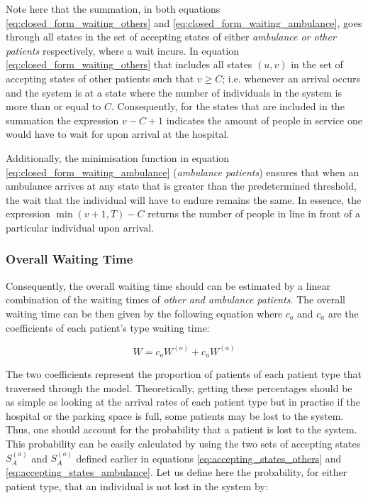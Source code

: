 Note here that the summation, in both equations \ref{eq:closed_form_waiting_others} 
and \ref{eq:closed_form_waiting_ambulance}, goes through all states in the set of accepting 
states of either \textit{ambulance or other patients} respectively, where a wait 
incurs. 
In equation \ref{eq:closed_form_waiting_others} that includes all states \((u,v)\) 
in the set of accepting states of other patients such that \( v \geq C\); i.e. 
whenever an arrival occurs and the system is at a state where the number of individuals 
in the system is more than or equal to $C$. 
Consequently, for the states that are included in the summation  the expression 
\( v-C+1 \) indicates the amount of people in service one would have to wait for 
upon arrival at the hospital.

Additionally, the minimisation function in equation \ref{eq:closed_form_waiting_ambulance} 
(\textit{ambulance patients}) ensures that when an ambulance arrives at any state 
that is greater than the predetermined threshold, the wait that the individual will 
have to endure remains the same. 
In essence, the expression \(\min(v+1,T) - C\) returns the number of people in line 
in front of a particular individual upon arrival.


\subsubsection{Overall Waiting Time}

Consequently, the overall waiting time should can be estimated by a linear combination 
of the waiting times of \textit{other and ambulance patients}. 
The overall waiting time can be then given by the following equation where \(c_o\) 
and \(c_a\) are the coefficients of each patient's type waiting time:

\begin{equation}\label{overall_waiting_time_coeff}
    W = c_o W^{(o)} + c_a W^{(a)}
\end{equation}

The two coefficients represent the proportion of patients of each patient type that 
traversed through the model. 
Theoretically, getting these percentages should be as simple as looking at the arrival 
rates of each patient type but in practise if the hospital or the parking space 
is full, some patients may be lost to the system. 
Thus, one should account for the probability that a patient is lost to the system. 
This probability can be easily calculated by using the two sets of accepting states 
\(S_A^{(a)}\) and \(S_A^{(o)}\) defined earlier in equations \ref{eq:accepting_states_others} 
and \ref{eq:accepting_states_ambulance}. 
Let us define here the probability, for either patient type, that an individual 
is not lost in the system by:

